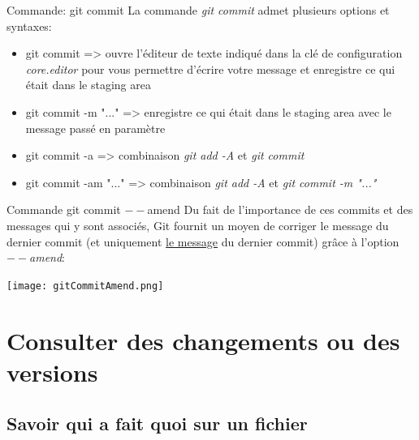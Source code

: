 \documentclass{beamer}
\begin{document}
\begin{frame}{Commande: git commit}
La commande \textit{git commit} admet plusieurs options et syntaxes:
\begin{itemize}
	\item git commit => ouvre l'éditeur de texte indiqué dans la clé de configuration 	          \textit{core.editor} pour vous permettre d'écrire votre message et enregistre 
	      ce qui était dans le staging area
	\item git commit -m "..." => enregistre ce qui était dans le staging area avec le 
	      message passé en paramètre
	\item git commit -a => combinaison \textit{git add -A} et \textit{git commit}
	\item git commit -am "..." => combinaison \textit{git add -A} et \textit{git commit -m "..."}
\end{itemize}
\end{frame}


\begin{frame}{Commande git commit $--$amend}
Du fait de l'importance de ces commits et des messages qui y sont associés, Git fournit un moyen de corriger le message du dernier commit (et uniquement \underline{le message} du dernier commit) grâce à l'option \textit{$--$amend}:
\begin{center}
	\texttt{[image: gitCommitAmend.png]}
\end{center}
\end{frame}




\section{Consulter des changements ou des versions}

\subsection{Savoir qui a fait quoi sur un fichier}
\end{document}

